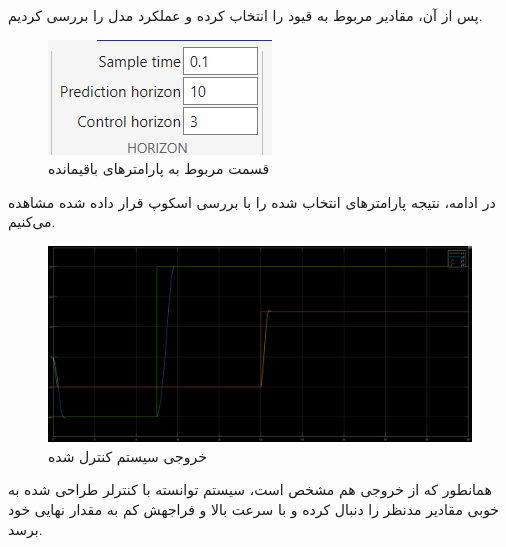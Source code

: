 \documentclass[14pt, a4paper]{extarticle}
\begin{document}
پس از آن، مقادیر مربوط به قیود را انتخاب کرده و عملکرد مدل را بررسی کردیم.\\
	\begin{figure}[h!]
	\centering
	\includegraphics[scale = 1]{Q2_sim_horizon.png}
	\caption{قسمت مربوط به پارامترهای باقیمانده}
	\end{figure}

در ادامه، نتیجه پارامترهای انتخاب شده را با بررسی اسکوپ قرار داده شده مشاهده می‌کنیم.
	\begin{figure}[h!]
	\centering
	\includegraphics[scale = 0.3]{Q2_sim_result.png}
	\caption{خروجی سیستم کنترل شده}
	\end{figure}

همانطور که از خروجی هم مشخص است، سیستم توانسته با کنترلر طراحی شده به خوبی مقادیر مدنظر را دنبال کرده و با سرعت بالا و فراجهش کم به مقدار نهایی خود برسد.
\end{document}
